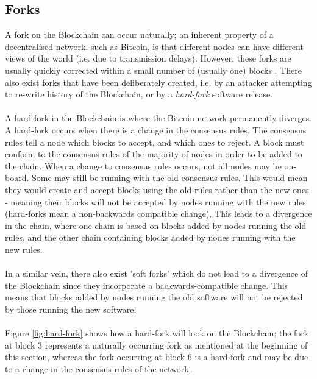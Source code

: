 \subsection{Forks}\label{background-forks}
A fork on the Blockchain can occur naturally; an inherent property of a decentralised network, such as Bitcoin, is that different nodes can have different views of the world (i.e. due to transmission delays). However, these forks are usually quickly corrected within a small number of (usually one) blocks \cite{RefWorks:doc:5c39e80ae4b0854ae611b047}. There also exist forks that have been deliberately created, i.e. by an attacker attempting to re-write history of the Blockchain, or by a \textit{hard-fork} software release. 
\\\\
A hard-fork in the Blockchain is where the Bitcoin network permanently diverges. A hard-fork occurs when there is a change in the consensus rules. The consensus rules tell a node which blocks to accept, and which ones to reject. A block must conform to the consensus rules of the majority of nodes in order to be added to the chain. When a change to consensus rules occurs, not all nodes may be on-board. Some may still be running with the old consensus rules. This would mean they would create and accept blocks using the old rules rather than the new ones - meaning their blocks will not be accepted by nodes running with the new rules (hard-forks mean a non-backwards compatible change). This leads to a divergence in the chain, where one chain is based on blocks added by nodes running the old rules, and the other chain containing blocks added by nodes running with the new rules. 
\\\\
In a similar vein, there also exist 'soft forks' which do not lead to a divergence of the Blockchain since they incorporate a backwards-compatible change. This means that blocks added by nodes running the old software will not be rejected by those running the new software. 
\\\\
Figure \ref{fig:hard-fork} shows how a hard-fork will look on the Blockchain; the fork at block 3 represents a naturally occurring fork as mentioned at the beginning of this section, whereas the fork occurring at block 6 is a hard-fork and may be due to a change in the consensus rules of the network \cite{RefWorks:doc:5c39e80ae4b0854ae611b047}. 

